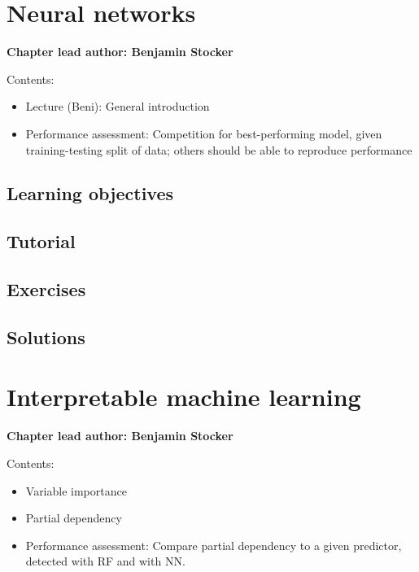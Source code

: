 \documentclass[
]{book}
\providecommand{\tightlist}{%
  \setlength{\itemsep}{0pt}\setlength{\parskip}{0pt}}
\begin{document}
\hypertarget{neural_nets}{%
\chapter{Neural networks}\label{neural_nets}}

\textbf{Chapter lead author: Benjamin Stocker}

Contents:

\begin{itemize}
\tightlist
\item
  Lecture (Beni): General introduction
\item
  Performance assessment: Competition for best-performing model, given training-testing split of data; others should be able to reproduce performance
\end{itemize}

\hypertarget{learning-objectives-10}{%
\section{Learning objectives}\label{learning-objectives-10}}

\hypertarget{tutorial-10}{%
\section{Tutorial}\label{tutorial-10}}

\hypertarget{exercises-10}{%
\section{Exercises}\label{exercises-10}}

\hypertarget{solutions-10}{%
\section{Solutions}\label{solutions-10}}

\hypertarget{interpretable_ml}{%
\chapter{Interpretable machine learning}\label{interpretable_ml}}

\textbf{Chapter lead author: Benjamin Stocker}

Contents:

\begin{itemize}
\tightlist
\item
  Variable importance
\item
  Partial dependency
\item
  Performance assessment: Compare partial dependency to a given predictor, detected with RF and with NN.
\end{itemize}
\end{document}
